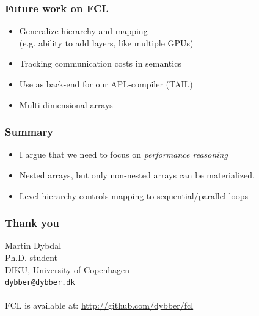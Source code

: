 \documentclass{beamer}
\begin{document}
\begin{frame}
  \frametitle{Future work on FCL}
  \begin{itemize}
  \item Generalize hierarchy and mapping \\
    {\small (e.g. ability to add layers, like multiple GPUs)}
  \item Tracking communication costs in semantics
  \item Use as back-end for our APL-compiler (TAIL)
  \item Multi-dimensional arrays
  \end{itemize}
\end{frame}

\begin{frame}
\frametitle{Summary}

\begin{itemize}
\item I argue that we need to focus on \textit{performance reasoning}
\item Nested arrays, but only non-nested arrays can be materialized.
\item Level hierarchy controls mapping to sequential/parallel loops
\end{itemize}

\end{frame}



\begin{frame}
\frametitle{Thank you}

Martin Dybdal \\
Ph.D. student \\
DIKU, University of Copenhagen \\
\texttt{dybber@dybber.dk} \\
~\\
FCL is available at: \url{http://github.com/dybber/fcl}
\end{frame}
\end{document}
